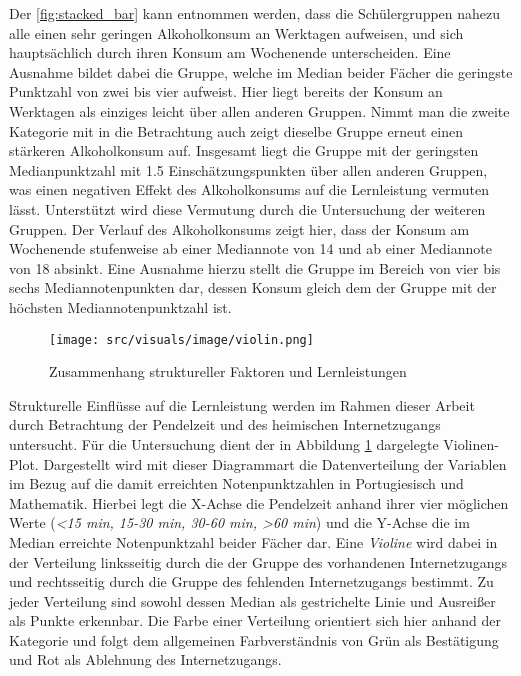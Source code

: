 Der \ref*{fig:stacked_bar} kann entnommen werden, dass die Schülergruppen nahezu alle einen sehr geringen Alkoholkonsum an Werktagen aufweisen, und sich hauptsächlich durch ihren Konsum am Wochenende unterscheiden.
Eine Ausnahme bildet dabei die Gruppe, welche im Median beider Fächer die geringste Punktzahl von zwei bis vier aufweist. 
Hier liegt bereits der Konsum an Werktagen als einziges leicht über allen anderen Gruppen.
Nimmt man die zweite Kategorie mit in die Betrachtung auch zeigt dieselbe Gruppe erneut einen stärkeren Alkoholkonsum auf.
Insgesamt liegt die Gruppe mit der geringsten Medianpunktzahl mit 1.5 Einschätzungspunkten über allen anderen Gruppen, was einen negativen Effekt des Alkoholkonsums auf die Lernleistung vermuten lässt.
Unterstützt wird diese Vermutung durch die Untersuchung der weiteren Gruppen. 
Der Verlauf des Alkoholkonsums zeigt hier, dass der Konsum am Wochenende stufenweise ab einer Mediannote von 14 und ab einer Mediannote von 18 absinkt. 
Eine Ausnahme hierzu stellt die Gruppe im Bereich von vier bis sechs Mediannotenpunkten dar, dessen Konsum gleich dem der Gruppe mit der höchsten Mediannotenpunktzahl ist.

\begin{figure}[htb]
    \centering
    \texttt{[image: src/visuals/image/violin.png]}
    \caption{Zusammenhang struktureller Faktoren und Lernleistungen}
    \label{fig:violin}
\end{figure}

Strukturelle Einflüsse auf die Lernleistung werden im Rahmen dieser Arbeit durch Betrachtung der Pendelzeit und des heimischen Internetzugangs untersucht.
Für die Untersuchung dient der in Abbildung \ref{fig:violin} dargelegte Violinen-Plot.
Dargestellt wird mit dieser Diagrammart die Datenverteilung der Variablen im Bezug auf die damit erreichten Notenpunktzahlen in Portugiesisch und Mathematik.
Hierbei legt die X-Achse die Pendelzeit anhand ihrer vier möglichen Werte (\textit{<15 min, 15-30 min, 30-60 min, >60 min}) und die Y-Achse die im Median erreichte Notenpunktzahl beider Fächer dar.
Eine \textit{Violine} wird dabei in der Verteilung linksseitig durch die der Gruppe des vorhandenen Internetzugangs und rechtsseitig durch die Gruppe des fehlenden Internetzugangs bestimmt.
Zu jeder Verteilung sind sowohl dessen Median als gestrichelte Linie und Ausreißer als Punkte erkennbar.
Die Farbe einer Verteilung orientiert sich hier anhand der Kategorie und folgt dem allgemeinen Farbverständnis von Grün als Bestätigung und Rot als Ablehnung des Internetzugangs.

